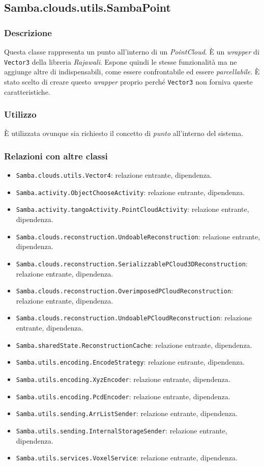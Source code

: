 \subsection{Samba.clouds.utils.SambaPoint}
\subsubsection{Descrizione}
Questa classe rappresenta un punto all'interno di un \emph{PointCloud}. È un \emph{wrapper} di \texttt{Vector3} della libreria \emph{Rajawali}. Espone quindi le stesse funzionalità ma ne aggiunge altre di indispensabili, come essere confrontabile ed essere \emph{parcellabile}. È stato scelto di creare questo \emph{wrapper} proprio perché \texttt{Vector3} non forniva queste caratteristiche.
\subsubsection{Utilizzo}
È utilizzata ovunque sia richiesto il concetto di \emph{punto} all'interno del sistema.
\subsubsection{Relazioni con altre classi}
\begin{itemize}
	\item \texttt{Samba.clouds.utils.Vector4}: relazione entrante, dipendenza.
	\item \texttt{Samba.activity.ObjectChooseActivity}: relazione entrante, dipendenza.
	\item \texttt{Samba.activity.tangoActivity.PointCloudActivity}:	relazione entrante, dipendenza.
	\item \texttt{Samba.clouds.reconstruction.UndoableReconstruction}: relazione entrante, dipendenza.
	\item \texttt{Samba.clouds.reconstruction.SerializzablePCloud3DReconstruction}: relazione entrante, dipendenza.
	\item \texttt{Samba.clouds.reconstruction.OverimposedPCloudReconstruction}: relazione entrante, dipendenza.
	\item \texttt{Samba.clouds.reconstruction.UndoablePCloudReconstruction}: relazione entrante, dipendenza.
	\item \texttt{Samba.sharedState.ReconstructionCache}: relazione entrante, dipendenza.
	\item \texttt{Samba.utils.encoding.EncodeStrategy}: relazione entrante, dipendenza.
	\item \texttt{Samba.utils.encoding.XyzEncoder}: relazione entrante, dipendenza.
	\item \texttt{Samba.utils.encoding.PcdEncoder}: relazione entrante, dipendenza.
	\item \texttt{Samba.utils.sending.ArrListSender}: relazione entrante, dipendenza.
	\item \texttt{Samba.utils.sending.InternalStorageSender}: relazione entrante, dipendenza.
	\item \texttt{Samba.utils.services.VoxelService}: relazione entrante, dipendenza.
\end{itemize}
